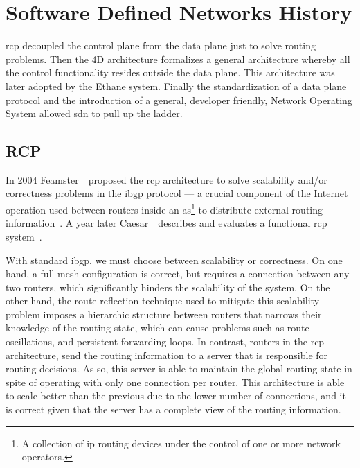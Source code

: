 \glsresetall

\section{Software Defined Networks History}
\gls{rcp} decoupled the control plane from the data plane just to solve routing problems. Then the 4D architecture formalizes a general architecture whereby all the control functionality resides outside the data plane.  This architecture was later adopted by the Ethane system. Finally the standardization of a data plane protocol and the introduction of a general, developer friendly, Network Operating System allowed \gls{sdn} to pull up the ladder. 

\subsection{RCP}
In 2004 Feamster~\etal\ proposed the \gls{rcp} architecture to solve scalability and/or correctness problems in the \gls{ibgp} protocol --- 
a crucial component of the Internet operation used between routers inside an \gls{as}\footnote{A collection of \gls{ip} routing devices under the control of one or more network operators.} to distribute external routing information~\cite{Feamster:2004tg}. 
A year later Caesar~\etal\ describes and evaluates a functional \gls{rcp} system~\cite{Caesar:2005ws}. 

With standard \gls{ibgp}, we must choose between scalability or correctness. 
On one hand, a full mesh configuration is correct, but requires a connection between any two routers, which significantly hinders the scalability of the system. 
On the other hand, the route reflection technique used to mitigate this scalability problem imposes a hierarchic structure between routers that narrows their knowledge of the routing state, which can cause problems such as route oscillations, and persistent forwarding loops. 
In contrast, routers in the \gls{rcp} architecture, send the routing information to a server that is responsible for routing decisions. 
As so, this server is able to maintain the global routing state in spite of operating with only one connection per router.
This architecture is able to scale better than the previous due to the lower number of connections, and it is correct given that the server has a complete view of the routing information.  


